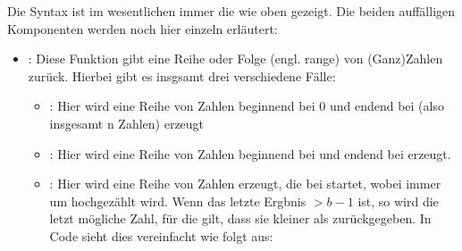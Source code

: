 \documentclass[letterpaper,10pt,english]{jupyterBook}
\begin{document}
\sphinxAtStartPar
Die Syntax ist im wesentlichen immer die wie oben gezeigt. Die beiden auffälligen Komponenten werden noch hier einzeln erläutert:
\begin{itemize}
\item {} 
\sphinxAtStartPar
{}: Diese Funktion gibt eine Reihe oder Folge (engl. range) von (Ganz\sphinxhyphen{})Zahlen zurück. Hierbei gibt es insgsamt drei verschiedene Fälle:
\begin{itemize}
\item {} 
\sphinxAtStartPar
{}: Hier wird eine Reihe von Zahlen beginnend bei 0 und endend bei  (also insgesamt n Zahlen) erzeugt

\item {} 
\sphinxAtStartPar
{}: Hier wird eine Reihe von Zahlen beginnend bei  und endend bei  erzeugt.

\item {} 
\sphinxAtStartPar
{}: Hier wird eine Reihe von Zahlen erzeugt, die bei  startet, wobei immer um  hochgezählt wird. Wenn das letzte Ergbnis \(> b-1\) ist, so wird die letzt mögliche Zahl, für die gilt, dass sie kleiner als  zurückgegeben. In Code sieht dies vereinfacht wie folgt aus:

\end{itemize}

\end{itemize}

\begin{sphinxVerbatim}[commandchars=\\\{\}]
   
      
    
       
          
        
     
\end{sphinxVerbatim}
\end{document}
